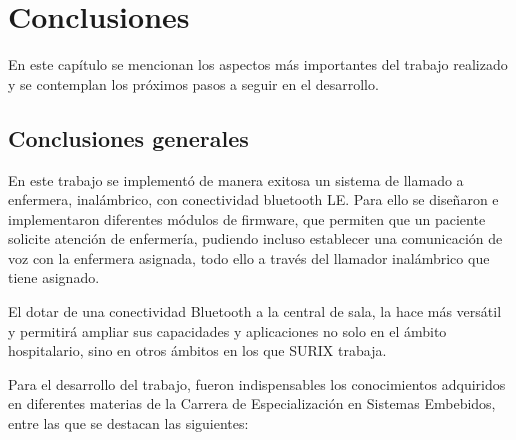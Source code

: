 
\chapter{Conclusiones} %

\label{Chapter5} %

En este capítulo se mencionan los aspectos más importantes del trabajo realizado y se contemplan los próximos pasos a seguir en el desarrollo.




\section{Conclusiones generales }

En este trabajo se implementó de manera exitosa un sistema de llamado a enfermera, inalámbrico, con conectividad bluetooth LE. Para ello se diseñaron e implementaron diferentes módulos de firmware, que permiten que un paciente solicite atención de enfermería, pudiendo incluso establecer una comunicación de voz con la enfermera asignada, todo ello a través del llamador inalámbrico que tiene asignado.

El dotar de una conectividad Bluetooth a la central de sala, la hace más versátil y permitirá ampliar sus capacidades y aplicaciones no solo en el ámbito hospitalario, sino en otros ámbitos en los que SURIX trabaja.

Para el desarrollo del trabajo, fueron indispensables los conocimientos adquiridos en diferentes materias de la Carrera de Especialización en Sistemas Embebidos, entre las que se destacan las siguientes:


